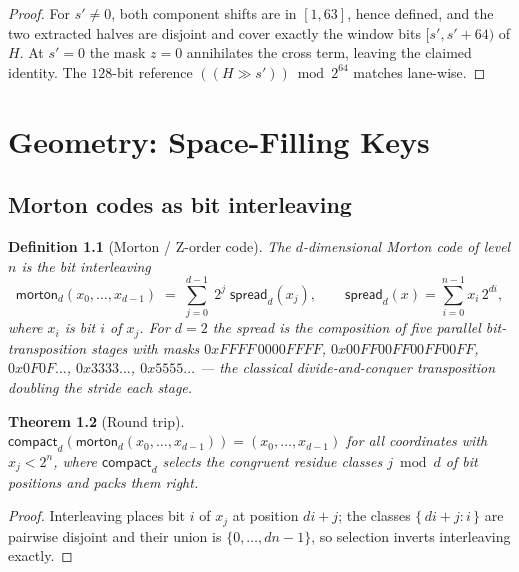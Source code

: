 \documentclass[11pt,a4paper]{report}
\newtheorem{theorem}{Theorem}[chapter]
\newtheorem{definition}[theorem]{Definition}
\begin{document}
\begin{proof}
For $s' \neq 0$, both component shifts are in $[1, 63]$, hence defined,
and the two extracted halves are disjoint and cover exactly the window
bits $[s', s'+64)$ of $H$. At $s' = 0$ the mask $z = 0$ annihilates the
cross term, leaving the claimed identity. The $128$-bit reference
$((H \gg s') ) \bmod 2^{64}$ matches lane-wise.
\end{proof}

\chapter{Geometry: Space-Filling Keys}

\section{Morton codes as bit interleaving}

\begin{definition}[Morton / Z-order code]
The $d$-dimensional Morton code of level $n$ is the bit interleaving
\begin{equation}
\mathsf{morton}_d(x_0, \dots, x_{d-1})
\;=\; \sum_{j=0}^{d-1} \; 2^{j} \; \mathsf{spread}_{d}\!\left(x_j\right),
\qquad
\mathsf{spread}_{d}(x) = \sum_{i=0}^{n-1} x_i \, 2^{di},
\end{equation}
where $x_i$ is bit $i$ of $x_j$. For $d = 2$ the spread is the
composition of five parallel bit-transposition stages with masks
$0{x}FFFF\,0000FFFF$, $0x00FF00FF00FF00FF$, $0x0F0F\ldots$,
$0x3333\ldots$, $0x5555\ldots$ --- the classical divide-and-conquer
transposition doubling the stride each stage.
\end{definition}

\begin{theorem}[Round trip]\label{thm:morton-roundtrip}
$\mathsf{compact}_d(\mathsf{morton}_d(x_0,\dots,x_{d-1})) =
(x_0, \dots, x_{d-1})$ for all coordinates with
$x_j < 2^n$, where $\mathsf{compact}_d$ selects the congruent residue
classes $j \bmod d$ of bit positions and packs them right.
\end{theorem}

\begin{proof}
Interleaving places bit $i$ of $x_j$ at position $di + j$; the classes
$\{\,di + j : i\,\}$ are pairwise disjoint and their union is
$\{0, \dots, dn - 1\}$, so selection inverts interleaving exactly.
\end{proof}
\end{document}

